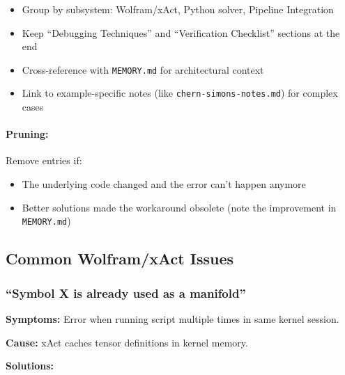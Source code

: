 \begin{itemize}
  \item Group by subsystem: Wolfram/xAct, Python solver, Pipeline Integration
  \item Keep ``Debugging Techniques'' and ``Verification Checklist'' sections at the end
  \item Cross-reference with \texttt{MEMORY.md} for architectural context
  \item Link to example-specific notes (like \texttt{chern-simons-notes.md}) for complex cases
\end{itemize}

\paragraph{Pruning:} Remove entries if:

\begin{itemize}
  \item The underlying code changed and the error can't happen anymore
  \item Better solutions made the workaround obsolete (note the improvement in \texttt{MEMORY.md})
\end{itemize}


\subsection{Common Wolfram/xAct Issues}
\label{sec:wolfram-xact-issues}

\subsubsection{``Symbol X is already used as a manifold''}

\textbf{Symptoms:} Error when running script multiple times in same kernel session.

\textbf{Cause:} xAct caches tensor definitions in kernel memory.

\textbf{Solutions:}

